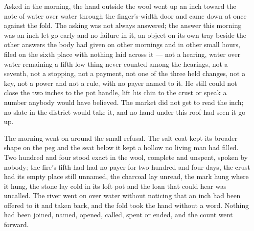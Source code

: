 \scenebreak

Asked in the morning, the hand outside the wool went up an inch toward the note of water over water through the finger's-width door and came down at once against the fold. The asking was not always answered; the answer this morning was an inch let go early and no failure in it, an object on its own tray beside the other answers the body had given on other mornings and in other small hours, filed on the sixth place with nothing laid across it --- not a hearing, water over water remaining a fifth low thing never counted among the hearings, not a seventh, not a stopping, not a payment, not one of the three held changes, not a key, not a power and not a rule, with no payer named to it. He still could not close the two inches to the pot handle, lift his chin to the crust or speak a number anybody would have believed. The market did not get to read the inch; no slate in the district would take it, and no hand under this roof had seen it go up.

The morning went on around the small refusal. The salt coat kept its broader shape on the peg and the seat below it kept a hollow no living man had filled. Two hundred and four stood exact in the wool, complete and unspent, spoken by nobody; the fire's fifth had had no payer for two hundred and four days, the crust had its empty place still unnamed, the charcoal lay unread, the mark hung where it hung, the stone lay cold in its loft pot and the loan that could hear was uncalled. The river went on over water without noticing that an inch had been offered to it and taken back, and the fold took the hand without a word. Nothing had been joined, named, opened, called, spent or ended, and the count went forward.
